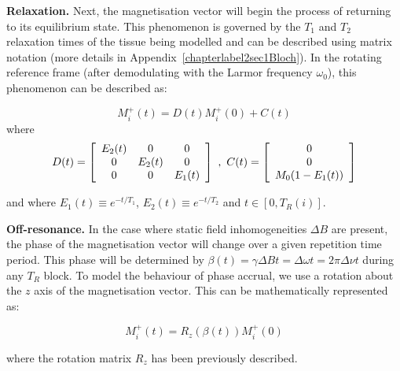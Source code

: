 \hfill

\textbf{Relaxation.} 
Next, the magnetisation vector will begin the process of returning to its equilibrium state.
This phenomenon is governed by the $T_1$ and $T_2$ relaxation times of the tissue being modelled and can be described using matrix notation (more details in Appendix~\ref{chapterlabel2sec1Bloch}).
In the rotating reference frame (after demodulating with the Larmor frequency $\omega_0$), this phenomenon can be described as:

\begin{equation}
    M^{+}_i (t)  = D(t) M^{+}_i (0) + C(t)
\end{equation}
where
\begin{equation}\label{eq:dmatrix}
    D ( t ) = \left[
    \begin{array}{c c c}
          E_2(t) &     0      &     0 \\
          0      & E_2(t) &     0 \\
          0      &     0      & E_1(t)
    \end{array}
    \right] \, \, \text{,  } \, 
    C ( t ) = \left[
    \begin{array}{c}
        0 \\
        0 \\
    M_0(1 - E_1(t))
    \end{array}
    \right]
\end{equation}

and where $E_1(t) \equiv e^{-t/T_1}$, $E_2(t) \equiv e^{-t/T_2}$ and
$t \in [0, T_R(i)]$.

\hfill

\textbf{Off-resonance.} 
In the case where static field inhomogeneities $\Delta B$ are present, the phase of the magnetisation vector will change over a given repetition time period. 
This phase will be determined by $\beta(t) = \gamma \Delta B t = \Delta \omega t = 2\pi \Delta \nu t$ during any $T_R$ block.
To model the behaviour of phase accrual, we use a rotation about the $z$ axis of the magnetisation vector.
This can be mathematically represented as:

\begin{equation}
    M^{+}_i (t)  = R_z(\beta(t)) M^{+}_i (0)
\end{equation}

where the rotation matrix $R_z$ has been previously described.


